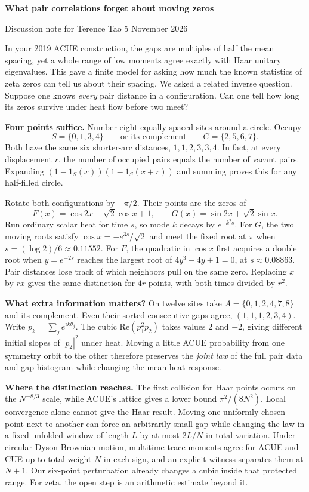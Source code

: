 \documentclass[10pt,letterpaper]{article}
\begin{document}
{\LARGE\bfseries What pair correlations forget about moving zeros}\par
{\small Discussion note for Terence Tao \hfill 5 November 2026}

In your 2019 ACUE construction, the gaps are multiples of half the mean spacing, yet a whole range of low moments agree exactly with Haar unitary eigenvalues. This gave a finite model for asking how much the known statistics of zeta zeros can tell us about their spacing. We asked a related inverse question. Suppose one knows \emph{every} pair distance in a configuration. Can one tell how long its zeros survive under heat flow before two meet?

\textbf{Four points suffice.} Number eight equally spaced sites around a circle. Occupy
\[
 S=\{0,1,3,4\}\qquad\text{or its complement}\qquad C=\{2,5,6,7\}.
\]
Both have the same six shorter-arc distances, $1,1,2,3,3,4$. In fact, at every displacement $r$, the number of occupied pairs equals the number of vacant pairs. Expanding $(1-1_S(x))(1-1_S(x+r))$ and summing proves this for any half-filled circle.

Rotate both configurations by $-\pi/2$. Their points are the zeros of
\[
 F(x)=\cos 2x-\sqrt2\cos x+1,\qquad G(x)=\sin 2x+\sqrt2\sin x .
\]
Run ordinary scalar heat for time $s$, so mode $k$ decays by $e^{-k^2s}$. For $G$, the two moving roots satisfy $\cos x=-e^{3s}/\sqrt2$ and meet the fixed root at $\pi$ when $s=(\log 2)/6\approx0.11552$. For $F$, the quadratic in $\cos x$ first acquires a double root when $y=e^{-2s}$ reaches the largest root of $4y^3-4y+1=0$, at $s\approx0.08863$. Pair distances lose track of which neighbors pull on the same zero. Replacing $x$ by $rx$ gives the same distinction for $4r$ points, with both times divided by $r^2$.

\textbf{What extra information matters?} On twelve sites take $A=\{0,1,2,4,7,8\}$ and its complement. Even their sorted consecutive gaps agree, $(1,1,1,2,3,4)$. Write $p_k=\sum_j e^{ik\theta_j}$. The cubic $\mathrm{Re}(p_1^2\overline{p_2})$ takes values $2$ and $-2$, giving different initial slopes of $|p_2|^2$ under heat. Moving a little ACUE probability from one symmetry orbit to the other therefore preserves the \emph{joint law} of the full pair data and gap histogram while changing the mean heat response.

\textbf{Where the distinction reaches.} The first collision for Haar points occurs on the $N^{-8/3}$ scale, while ACUE's lattice gives a lower bound $\pi^2/(8N^2)$. Local convergence alone cannot give the Haar result. Moving one uniformly chosen point next to another can force an arbitrarily small gap while changing the law in a fixed unfolded window of length $L$ by at most $2L/N$ in total variation. Under circular Dyson Brownian motion, multitime trace moments agree for ACUE and CUE up to total weight $N$ in each sign, and an explicit witness separates them at $N+1$. Our six-point perturbation already changes a cubic inside that protected range. For zeta, the open step is an arithmetic estimate beyond it.
\end{document}
